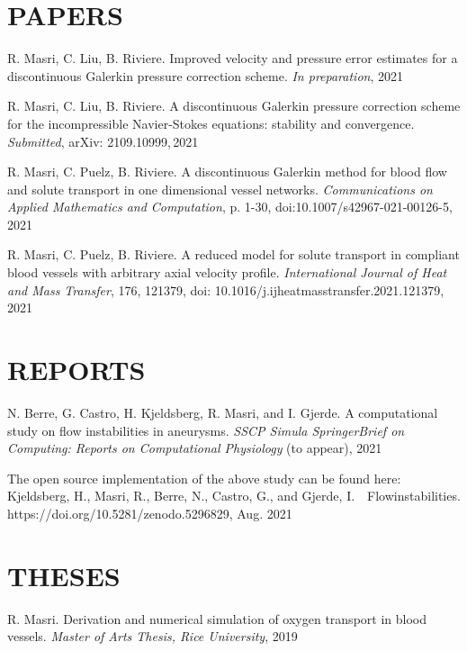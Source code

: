 \documentclass[margin]{res}
\begin{document}
\begin{resume}
\section{PAPERS}
\par R. Masri, C. Liu, B. Riviere. Improved velocity and pressure error estimates for a discontinuous Galerkin pressure correction scheme. \textit{In preparation}, 2021 
\par R. Masri, C. Liu, B. Riviere. A discontinuous Galerkin pressure correction scheme for the incompressible Navier-Stokes equations: stability and convergence. \textit{Submitted},  arXiv: 2109.10999,\,2021
\par R. Masri, C. Puelz, B. Riviere. A discontinuous Galerkin method for blood flow and solute transport in one dimensional vessel networks. 
 \textit{Communications on Applied Mathematics and Computation}, p. 1-30, doi:10.1007/s42967-021-00126-5, 2021
\par
R. Masri, C. Puelz, B. Riviere. A reduced model for solute transport in compliant blood vessels with arbitrary axial velocity profile. \textit{International Journal of Heat and Mass Transfer}, 176, 121379, doi: 10.1016/j.ijheatmasstransfer.2021.121379, 2021

\section{REPORTS} 
\par N. Berre, G. Castro, H.  Kjeldsberg, R. Masri, and I. Gjerde. A computational study on flow instabilities in aneurysms. \textit{SSCP Simula SpringerBrief on Computing: Reports on Computational Physiology} (to appear), 2021 
\par  The open source implementation of the above study can be found here: \\  
Kjeldsberg, H., Masri, R., Berre, N., Castro, G., and Gjerde, I. \,\,  Flowinstabilities. \\ https://doi.org/10.5281/zenodo.5296829, Aug. 2021

\section{THESES}
\par  R. Masri. Derivation and numerical simulation of oxygen transport in blood vessels. \textit{ Master of Arts Thesis, Rice University}, 2019


\end{resume}
\end{document}
